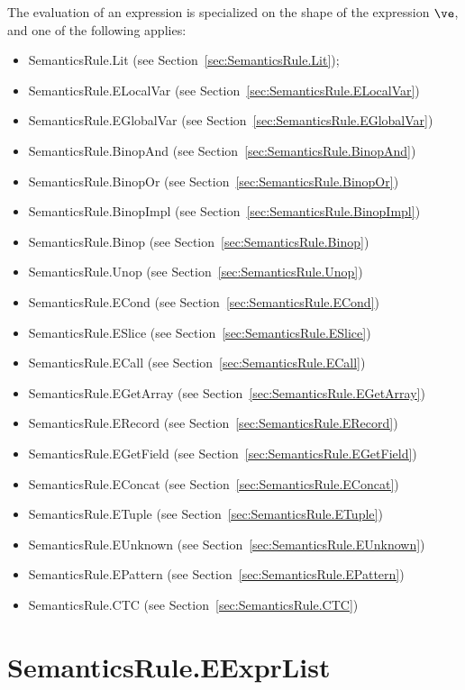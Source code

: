 \documentclass{book}
\begin{document}
The evaluation of an expression is specialized on the shape of the expression $\ve$,
and one of the following applies:
\begin{itemize}
\item SemanticsRule.Lit (see Section~\ref{sec:SemanticsRule.Lit});
\item SemanticsRule.ELocalVar (see Section~\ref{sec:SemanticsRule.ELocalVar})
\item SemanticsRule.EGlobalVar (see Section~\ref{sec:SemanticsRule.EGlobalVar})
\item SemanticsRule.BinopAnd (see Section~\ref{sec:SemanticsRule.BinopAnd})
\item SemanticsRule.BinopOr (see Section~\ref{sec:SemanticsRule.BinopOr})
\item SemanticsRule.BinopImpl (see Section~\ref{sec:SemanticsRule.BinopImpl})
\item SemanticsRule.Binop (see Section~\ref{sec:SemanticsRule.Binop})
\item SemanticsRule.Unop (see Section~\ref{sec:SemanticsRule.Unop})
\item SemanticsRule.ECond (see Section~\ref{sec:SemanticsRule.ECond})
\item SemanticsRule.ESlice (see Section~\ref{sec:SemanticsRule.ESlice})
\item SemanticsRule.ECall (see Section~\ref{sec:SemanticsRule.ECall})
\item SemanticsRule.EGetArray (see Section~\ref{sec:SemanticsRule.EGetArray})
\item SemanticsRule.ERecord (see Section~\ref{sec:SemanticsRule.ERecord})
\item SemanticsRule.EGetField (see Section~\ref{sec:SemanticsRule.EGetField})
\item SemanticsRule.EConcat (see Section~\ref{sec:SemanticsRule.EConcat})
\item SemanticsRule.ETuple (see Section~\ref{sec:SemanticsRule.ETuple})
\item SemanticsRule.EUnknown (see Section~\ref{sec:SemanticsRule.EUnknown})
\item SemanticsRule.EPattern (see Section~\ref{sec:SemanticsRule.EPattern})
\item SemanticsRule.CTC (see Section~\ref{sec:SemanticsRule.CTC})
\end{itemize}

\section{SemanticsRule.EExprList \label{sec:SemanticsRule.EExprList}}
\end{document}
